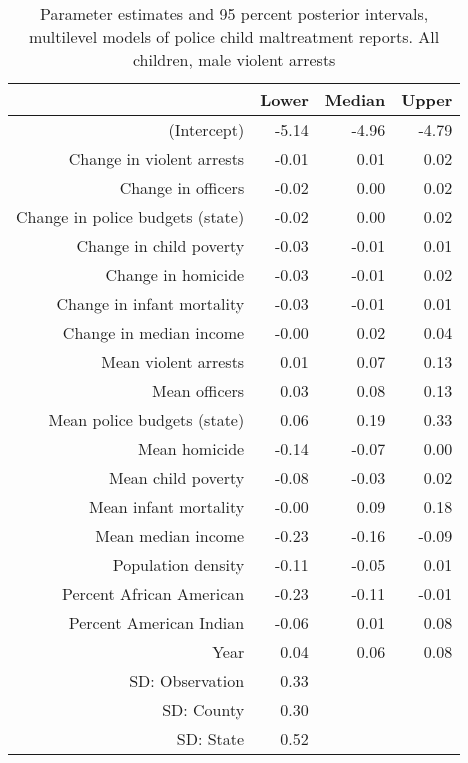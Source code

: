 \begin{table}[ht]
\centering
\begin{tabular}{rrrr}
  \hline
 & Lower & Median & Upper \\ 
  \hline
(Intercept) & -5.14 & -4.96 & -4.79 \\ 
  Change in violent arrests & -0.01 & 0.01 & 0.02 \\ 
  Change in officers & -0.02 & 0.00 & 0.02 \\ 
  Change in police budgets (state) & -0.02 & 0.00 & 0.02 \\ 
  Change in child poverty & -0.03 & -0.01 & 0.01 \\ 
  Change in homicide & -0.03 & -0.01 & 0.02 \\ 
  Change in infant mortality & -0.03 & -0.01 & 0.01 \\ 
  Change in median income & -0.00 & 0.02 & 0.04 \\ 
  Mean violent arrests & 0.01 & 0.07 & 0.13 \\ 
  Mean officers & 0.03 & 0.08 & 0.13 \\ 
  Mean police budgets (state) & 0.06 & 0.19 & 0.33 \\ 
  Mean homicide & -0.14 & -0.07 & 0.00 \\ 
  Mean child poverty & -0.08 & -0.03 & 0.02 \\ 
  Mean infant mortality & -0.00 & 0.09 & 0.18 \\ 
  Mean median income & -0.23 & -0.16 & -0.09 \\ 
  Population density & -0.11 & -0.05 & 0.01 \\ 
  Percent African American & -0.23 & -0.11 & -0.01 \\ 
  Percent American Indian & -0.06 & 0.01 & 0.08 \\ 
  Year & 0.04 & 0.06 & 0.08 \\ 
  SD: Observation & 0.33 &  &  \\ 
  SD: County & 0.30 &  &  \\ 
  SD: State & 0.52 &  &  \\ 
   \hline
\end{tabular}
\caption{Parameter estimates and 95 percent posterior intervals, multilevel models of 
             police child maltreatment reports. All children, male violent arrests} 
\end{table}
